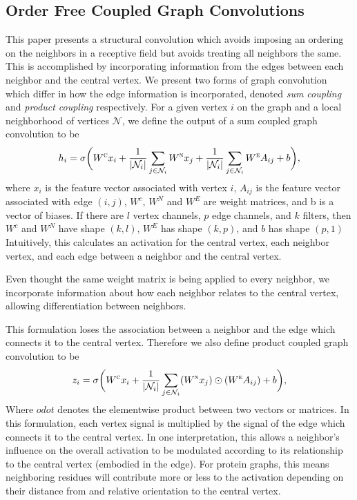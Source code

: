 \subsection{Order Free Coupled Graph Convolutions}
This paper presents a structural convolution which avoids imposing an ordering on the neighbors in a receptive field but avoids treating all neighbors the same.
This is accomplished by incorporating information from the edges between each neighbor and the central vertex.
We present two forms of graph convolution which differ in how the edge information is incorporated, denoted \textit{sum coupling} and \textit{product coupling} respectively.
For a given vertex $i$ on the graph and a local neighborhood of vertices $\mathcal{N}$, we define the output of a sum coupled graph convolution to be
\begin{equation}
h_i = \sigma \bigg( W^{\textsc{c}} x_i + \frac{1}{|\mathcal{N}_i|}\sum_{j \in \mathcal{N}_i} W^{\textsc{n}} x_j + \frac{1}{|\mathcal{N}_i|}\sum_{j \in \mathcal{N}_i} W^{\textsc{e}} A_{ij} + b \bigg),
\label{eq:sum_coupling}
\end{equation}
where $x_i$ is the feature vector associated with vertex $i$, $A_{ij}$ is the feature vector associated with edge $(i, j)$, $W^c$, $W^N$ and $W^E$ are weight matrices, and b is a vector of biases. 
If there are $l$ vertex channels, $p$ edge channels, and $k$ filters, then $W^c$ and $W^N$ have shape $(k, l)$, $W^E$ has shape $(k, p)$, and $b$ has shape $(p, 1)$
Intuitively, this calculates an activation for the central vertex, each neighbor vertex, and each edge between a neighbor and the central vertex.

Even thought the same weight matrix is being applied to every neighbor, we incorporate information about how each neighbor relates to the central vertex, allowing differentiation between neighbors. 

This formulation loses the association between a neighbor and the edge which connects it to the central vertex. 
Therefore we also define product coupled graph convolution to be 
\begin{equation}
z_i = \sigma \bigg( W^{\textsc{c}} x_i + \frac{1}{|\mathcal{N}_i|}\sum_{j \in \mathcal{N}_i} (W^{\textsc{n}} x_j) \odot (W^{\textsc{e}} A_{ij}) + b \bigg),
\label{eq:prod_coupling}
\end{equation}
Where $odot$ denotes the elementwise product between two vectors or matrices. 
In this formulation, each vertex signal is multiplied by the signal of the edge which connects it to the central vertex.
In one interpretation, this allows a neighbor's influence on the overall activation to be modulated according to its relationship to the central vertex (embodied in the edge). 
For protein graphs, this means neighboring residues will contribute more or less to the activation depending on their distance from and relative orientation to the central vertex.

